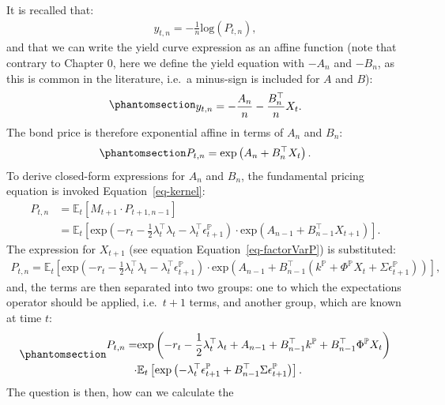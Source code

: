 \documentclass[
  letterpaper,
  DIV=11,
  numbers=noendperiod]{scrreprt}
\begin{document}
It is recalled that:
\begin{align}
    y_{t,n} = -\frac{1}{n}\text{log}(P_{t,n}),
\end{align}
and that we can write the yield curve expression as an affine function
(note that contrary to Chapter 0, here we define the yield equation with
\(-A_n\) and \(-B_n\), as this is common in the literature, i.e.~a
minus-sign is included for \(A\) and \(B\)):
\begin{equation}\protect\phantomsection\label{eq-yield}{
\begin{align}
    y_{t,n} = -\frac{A_{n}}{n} - \frac{B^{\top}_{n}}{n} X_t.
\end{align}
}\end{equation} The bond price is therefore exponential affine in terms
of \(A_{n}\) and \(B_{n}\):
\begin{equation}\protect\phantomsection\label{eq-Pt1}{
\begin{align}
    P_{t,n} = \text{exp} \left( A_{n} + B^{\top}_{n} X_t \right).
\end{align}
}\end{equation} To derive closed-form expressions for \(A_{n}\) and
\(B_{n}\), the fundamental pricing equation is invoked
Equation~\ref{eq-kernel}:
\begin{align}
    P_{t,n} &= \mathbb{E}_t\left[ M_{t+1} \cdot P_{t+1,n-1} \right] \\
               &= \mathbb{E}_t \left[ \text{exp}\left( -r_t -\frac{1}{2} \lambda^{\top}_t\lambda_t - \lambda^{\top}_t \epsilon^\mathbb{P}_{t+1} \right) \cdot \text{exp}\left( A_{n-1} + B^{\top}_{n-1} X_{t+1} \right) \right].
\end{align}
The expression for \(X_{t+1}\) (see equation
Equation~\ref{eq-factorVarP}) is substituted:
\begin{align}
    P_{t,n} = \mathbb{E}_t \left[ \text{exp}\left( -r_t -\frac{1}{2} \lambda^{\top}_t \lambda_t - \lambda^{\top}_t \epsilon^\mathbb{P}_{t+1} \right) \cdot \text{exp}\left( A_{n-1} + B^{\top}_{n-1} \left( k^\mathbb{P}+\Phi^\mathbb{P} X_{t} + \Sigma \epsilon^\mathbb{P}_{t+1} \right) \right) \right],
\end{align}
and, the terms are then separated into two groups: one to which the
expectations operator should be applied, i.e.~\(t+1\) terms, and another
group, which are known at time \(t\):
\begin{equation}\protect\phantomsection\label{eq-PtIntermed}{
\begin{align}
    P_{t,n} = &\text{exp}\left( -r_t - \frac{1}{2} \lambda^{\top}_t \lambda_t + A_{n-1} + B^{\top}_{n-1} k^{\mathbb{P}} +B^{\top}_{n-1} \Phi^\mathbb{P} X_{t} \right) \nonumber \\ 
    \cdot &\mathbb{E}_t\left[ \text{exp}\left( -\lambda^{\top}_t \epsilon^{\mathbb{P}}_{t+1} + B^{\top}_{n-1} \Sigma \epsilon^\mathbb{P}_{t+1} \right)  \right].
\end{align}
}\end{equation} The question is then, how can we calculate the
\end{document}
